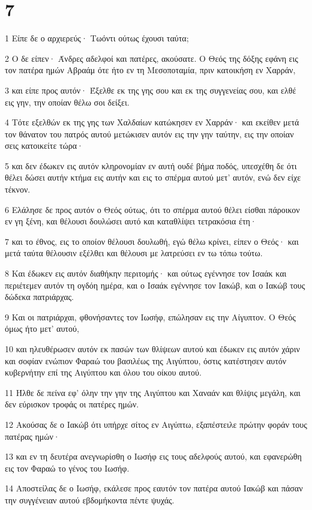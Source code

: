 \chapter{7}

\par 1 Είπε δε ο αρχιερεύς· Τωόντι ούτως έχουσι ταύτα;
\par 2 Ο δε είπεν· Άνδρες αδελφοί και πατέρες, ακούσατε. Ο Θεός της δόξης εφάνη εις τον πατέρα ημών Αβραάμ ότε ήτο εν τη Μεσοποταμία, πριν κατοικήση εν Χαρράν,
\par 3 και είπε προς αυτόν· Έξελθε εκ της γης σου και εκ της συγγενείας σου, και ελθέ εις γην, την οποίαν θέλω σοι δείξει.
\par 4 Τότε εξελθών εκ της γης των Χαλδαίων κατώκησεν εν Χαρράν· και εκείθεν μετά τον θάνατον του πατρός αυτού μετώκισεν αυτόν εις την γην ταύτην, εις την οποίαν σεις κατοικείτε τώρα·
\par 5 και δεν έδωκεν εις αυτόν κληρονομίαν εν αυτή ουδέ βήμα ποδός, υπεσχέθη δε ότι θέλει δώσει αυτήν κτήμα εις αυτήν και εις το σπέρμα αυτού μετ' αυτόν, ενώ δεν είχε τέκνον.
\par 6 Ελάλησε δε προς αυτόν ο Θεός ούτως, ότι το σπέρμα αυτού θέλει είσθαι πάροικον εν γη ξένη, και θέλουσι δουλώσει αυτό και καταθλίψει τετρακόσια έτη·
\par 7 και το έθνος, εις το οποίον θέλουσι δουλωθή, εγώ θέλω κρίνει, είπεν ο Θεός· και μετά ταύτα θέλουσιν εξέλθει και θέλουσι με λατρεύσει εν τω τόπω τούτω.
\par 8 Και έδωκεν εις αυτόν διαθήκην περιτομής· και ούτως εγέννησε τον Ισαάκ και περιέτεμεν αυτόν τη ογδόη ημέρα, και ο Ισαάκ εγέννησε τον Ιακώβ, και ο Ιακώβ τους δώδεκα πατριάρχας.
\par 9 Και οι πατριάρχαι, φθονήσαντες τον Ιωσήφ, επώλησαν εις την Αίγυπτον. Ο Θεός όμως ήτο μετ' αυτού,
\par 10 και ηλευθέρωσεν αυτόν εκ πασών των θλίψεων αυτού και έδωκεν εις αυτόν χάριν και σοφίαν ενώπιον Φαραώ του βασιλέως της Αιγύπτου, όστις κατέστησεν αυτόν κυβερνήτην επί της Αιγύπτου και όλου του οίκου αυτού.
\par 11 Ήλθε δε πείνα εφ' όλην την γην της Αιγύπτου και Χαναάν και θλίψις μεγάλη, και δεν εύρισκον τροφάς οι πατέρες ημών.
\par 12 Ακούσας δε ο Ιακώβ ότι υπήρχε σίτος εν Αιγύπτω, εξαπέστειλε πρώτην φοράν τους πατέρας ημών·
\par 13 και εν τη δευτέρα ανεγνωρίσθη ο Ιωσήφ εις τους αδελφούς αυτού, και εφανερώθη εις τον Φαραώ το γένος του Ιωσήφ.
\par 14 Αποστείλας δε ο Ιωσήφ, εκάλεσε προς εαυτόν τον πατέρα αυτού Ιακώβ και πάσαν την συγγένειαν αυτού εβδομήκοντα πέντε ψυχάς.
